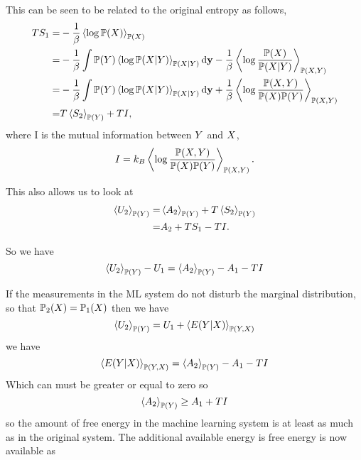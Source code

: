 \documentclass[]{article}
\begin{document}
This can be seen to be related to the original entropy as follows, 
\begin{align*}
TS_1 = & -\frac{1}{\beta} \left\langle \log \mathbb{P}(X) \right\rangle_{\mathbb{P}(X )} \\
= & -\frac{1}{\beta} \int \mathbb{P}(Y) \left\langle \log \mathbb{P}(X | Y) \right\rangle_{\mathbb{P}(X | Y)} \text{d}\mathbf{y} - \frac{1}{\beta} \left\langle \log \frac{\mathbb{P}(X)}{\mathbb{P}(X | Y)} \right\rangle_{\mathbb{P}(X, Y)}\\
= & -\frac{1}{\beta} \int \mathbb{P}(Y) \left\langle \log \mathbb{P}(X | Y) \right\rangle_{\mathbb{P}(X | Y)} \text{d}\mathbf{y} + \frac{1}{\beta} \left\langle \log \frac{\mathbb{P}(X , Y)}{\mathbb{P}(X)\mathbb{P}(Y)} \right\rangle_{\mathbb{P}(X, Y)} \\
= & T\left\langle S_2 \right\rangle_{\mathbb{P}(Y)}  + T I,
\end{align*}
where I is the mutual information between \(Y\) and
\(X\), 
\[
I = k_B \left\langle \log \frac{\mathbb{P}(X , Y)}{\mathbb{P}(X)\mathbb{P}(Y)} \right\rangle_{\mathbb{P}(X, Y)}. 
\]

This also allows us to look at 
\begin{align*}
\left\langle U_2 \right\rangle_{\mathbb{P}(Y)} = & \left\langle A_2 \right\rangle_{\mathbb{P}(Y)} +  T\left\langle S_2 \right\rangle_{\mathbb{P}(Y)} \\
= & A_2 + TS_1 - TI.
\end{align*}


So we have \[
\left\langle U_2 \right\rangle_{\mathbb{P}(Y)}- U_1    = \left\langle A_2 \right\rangle_{\mathbb{P}(Y)}  - A_1 - TI
\]

If the measurements in the ML system do not disturb the marginal
distribution, so that
\(\mathbb{P}_2(X) = \mathbb{P}_1(X)\) then
we have 
\[
\left\langle U_2 \right\rangle_{\mathbb{P}(Y)} = U_1 + \left\langle E(Y|X) \right\rangle_{\mathbb{P}(Y, X)}
\] 
we have 
\[
\left\langle E(Y|X) \right\rangle_{\mathbb{P}(Y, X)}  = \left\langle A_2 \right\rangle_{\mathbb{P}(Y)}  - A_1 - TI
\] 
Which can must be greater or equal to zero so 
\[
\left\langle A_2 \right\rangle_{\mathbb{P}(Y)} \geq A_1 + TI
\] 
so the amount of free energy in the machine learning system is at
least as much as in the original system. The additional available energy
is free energy is now available as 
\[
\]
\end{document}
